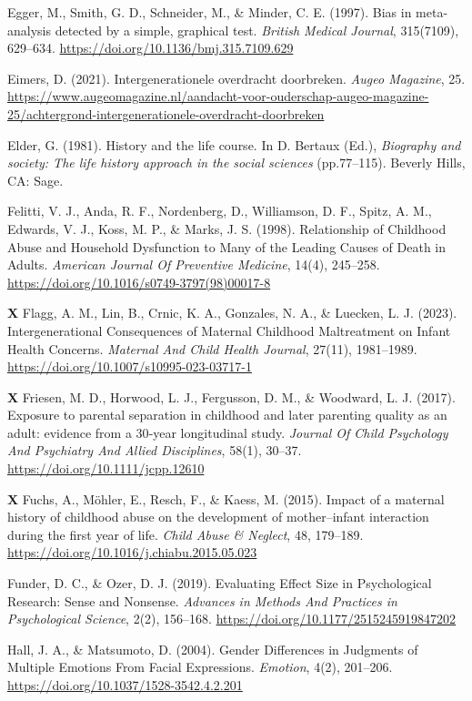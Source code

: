 \documentclass[12pt]{article}
\begin{document}
Egger, M., Smith, G. D., Schneider, M., \& Minder, C. E. (1997). Bias in
meta-analysis detected by a simple, graphical test. \emph{British
Medical Journal}, 315(7109), 629--634.
\url{https://doi.org/10.1136/bmj.315.7109.629}

Eimers, D. (2021). Intergenerationele overdracht doorbreken. \emph{Augeo
Magazine}, 25.
\url{https://www.augeomagazine.nl/aandacht-voor-ouderschap-augeo-magazine-25/achtergrond-intergenerationele-overdracht-doorbreken}

Elder, G. (1981). History and the life course. In D. Bertaux (Ed.),
\emph{Biography and society: The life history approach in the social
sciences} (pp.77--115). Beverly Hills, CA: Sage.

Felitti, V. J., Anda, R. F., Nordenberg, D., Williamson, D. F., Spitz,
A. M., Edwards, V. J., Koss, M. P., \& Marks, J. S. (1998). Relationship
of Childhood Abuse and Household Dysfunction to Many of the Leading
Causes of Death in Adults. \emph{American Journal Of Preventive
Medicine}, 14(4), 245--258.
\url{https://doi.org/10.1016/s0749-3797(98)00017-8}

\textbf{X} Flagg, A. M., Lin, B., Crnic, K. A., Gonzales, N. A., \&
Luecken, L. J. (2023). Intergenerational Consequences of Maternal
Childhood Maltreatment on Infant Health Concerns. \emph{Maternal And
Child Health Journal}, 27(11), 1981--1989.
\url{https://doi.org/10.1007/s10995-023-03717-1}

\textbf{X} Friesen, M. D., Horwood, L. J., Fergusson, D. M., \&
Woodward, L. J. (2017). Exposure to parental separation in childhood and
later parenting quality as an adult: evidence from a 30‐year
longitudinal study. \emph{Journal Of Child Psychology And Psychiatry And
Allied Disciplines}, 58(1), 30--37.
\url{https://doi.org/10.1111/jcpp.12610}

\textbf{X} Fuchs, A., Möhler, E., Resch, F., \& Kaess, M. (2015). Impact
of a maternal history of childhood abuse on the development of
mother--infant interaction during the first year of life. \emph{Child
Abuse \& Neglect}, 48, 179--189.
\url{https://doi.org/10.1016/j.chiabu.2015.05.023}

Funder, D. C., \& Ozer, D. J. (2019). Evaluating Effect Size in
Psychological Research: Sense and Nonsense. \emph{Advances in Methods
And Practices in Psychological Science}, 2(2), 156--168.
\url{https://doi.org/10.1177/2515245919847202}

Hall, J. A., \& Matsumoto, D. (2004). Gender Differences in Judgments of
Multiple Emotions From Facial Expressions. \emph{Emotion}, 4(2),
201--206. \url{https://doi.org/10.1037/1528-3542.4.2.201}
\end{document}
